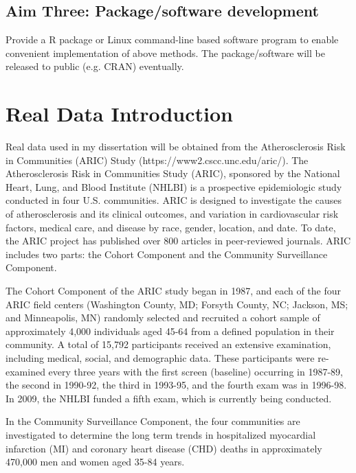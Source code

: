 \documentclass[12pt]{article}
\begin{document}
\subsection*{Aim Three: Package/software development}
Provide a R package or Linux command-line based software program to enable convenient implementation of above methods. The package/software will be released to public (e.g. CRAN) eventually.

\newpage
\section{Real Data Introduction}\label{sec:data}
Real data used in my dissertation will be obtained from
the Atherosclerosis Risk in Communities (ARIC) Study (https://www2.cscc.unc.edu/aric/). 
The Atherosclerosis Risk in Communities Study (ARIC), sponsored by the National Heart, Lung, and Blood Institute (NHLBI) is a prospective epidemiologic study conducted in four U.S. communities.  ARIC is designed to investigate the causes of atherosclerosis and its clinical outcomes, and variation in cardiovascular risk factors, medical care, and disease by race, gender, location, and date.  To date, the ARIC project has published over 800 articles in peer-reviewed journals. ARIC includes two parts: the Cohort Component and the Community Surveillance Component. 

The Cohort Component of the ARIC study began in 1987, and each of the four ARIC field centers (Washington County, MD; Forsyth County, NC; Jackson, MS; and Minneapolis, MN) randomly selected and recruited a cohort sample of approximately 4,000 individuals aged 45-64 from a defined population in their community.  A total of 15,792 participants received an extensive examination, including medical, social, and demographic data.  These participants were re-examined every three years with the first screen (baseline) occurring in 1987-89, the second in 1990-92, the third in 1993-95, and the fourth exam was in 1996-98. In 2009, the NHLBI funded a fifth exam, which is currently being conducted.

In the Community Surveillance Component, the four communities are investigated to determine the long term trends in hospitalized myocardial infarction (MI) and coronary heart disease (CHD) deaths in approximately 470,000 men and women aged 35-84 years.\\
\end{document}
